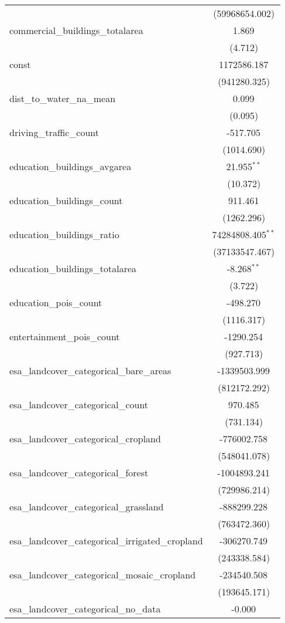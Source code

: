 \begin{table}[!htbp]
\begin{tabular}{@{\extracolsep{5pt}}lc}
  & (59968654.002) \\
 commercial_buildings_totalarea & 1.869$^{}$ \\
  & (4.712) \\
 const & 1172586.187$^{}$ \\
  & (941280.325) \\
 dist_to_water_na_mean & 0.099$^{}$ \\
  & (0.095) \\
 driving_traffic_count & -517.705$^{}$ \\
  & (1014.690) \\
 education_buildings_avgarea & 21.955$^{**}$ \\
  & (10.372) \\
 education_buildings_count & 911.461$^{}$ \\
  & (1262.296) \\
 education_buildings_ratio & 74284808.405$^{**}$ \\
  & (37133547.467) \\
 education_buildings_totalarea & -8.268$^{**}$ \\
  & (3.722) \\
 education_pois_count & -498.270$^{}$ \\
  & (1116.317) \\
 entertainment_pois_count & -1290.254$^{}$ \\
  & (927.713) \\
 esa_landcover_categorical_bare_areas & -1339503.999$^{}$ \\
  & (812172.292) \\
 esa_landcover_categorical_count & 970.485$^{}$ \\
  & (731.134) \\
 esa_landcover_categorical_cropland & -776002.758$^{}$ \\
  & (548041.078) \\
 esa_landcover_categorical_forest & -1004893.241$^{}$ \\
  & (729986.214) \\
 esa_landcover_categorical_grassland & -888299.228$^{}$ \\
  & (763472.360) \\
 esa_landcover_categorical_irrigated_cropland & -306270.749$^{}$ \\
  & (243338.584) \\
 esa_landcover_categorical_mosaic_cropland & -234540.508$^{}$ \\
  & (193645.171) \\
 esa_landcover_categorical_no_data & -0.000$^{}$ \\

\end{tabular}
\end{table}
